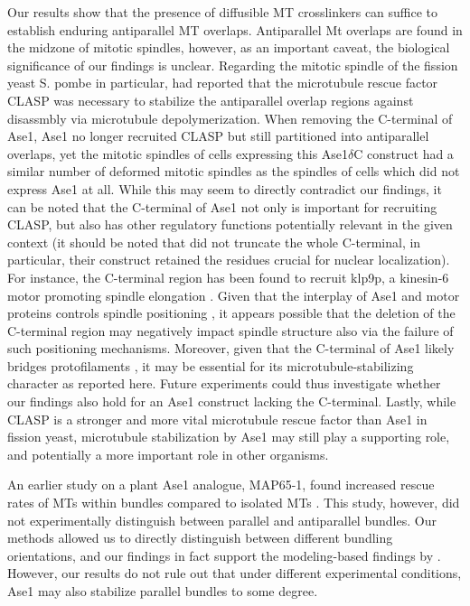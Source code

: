 Our results show that the presence of diffusible MT crosslinkers can suffice to establish enduring antiparallel MT overlaps. Antiparallel Mt overlaps are found in the midzone of mitotic spindles, however, as an important caveat, the biological significance of our findings is unclear. Regarding the mitotic spindle of the fission yeast S. pombe in particular, \cite{Bratman2007b} had reported that the microtubule rescue factor CLASP was necessary to stabilize the antiparallel overlap regions against disassmbly via microtubule depolymerization. When removing the C-terminal of Ase1, Ase1 no longer recruited CLASP but still partitioned into antiparallel overlaps, yet the mitotic spindles of cells expressing this Ase1$\delta$C construct had a similar number of deformed mitotic spindles as the spindles of cells which did not express Ase1 at all. While this may seem to directly contradict our findings, it can be noted that the C-terminal of Ase1 not only is important for recruiting CLASP, but also has other regulatory functions potentially relevant in the given context (it should be noted that \cite{Bratman2007b} did not truncate the whole C-terminal, in particular, their construct retained the residues crucial for nuclear localization). For instance, the C-terminal region has been found to recruit klp9p, a kinesin-6 motor promoting spindle elongation . Given that the interplay of Ase1 and motor proteins controls spindle positioning , it appears possible that the deletion of the C-terminal region may negatively impact spindle structure also via the failure of such positioning mechanisms. Moreover, given that the C-terminal of Ase1 likely bridges protofilaments , it may be essential for its microtubule-stabilizing character as reported here. Future experiments could thus investigate whether our findings also hold for an Ase1 construct lacking the C-terminal. Lastly, while CLASP is a stronger and more vital microtubule rescue factor than Ase1 in fission yeast, microtubule stabilization by Ase1 may still play a supporting role, and potentially a more important role in other organisms. \par

An earlier study on a plant Ase1 analogue, MAP65-1, found increased rescue rates of MTs within bundles compared to isolated MTs \parencite{Stoppin-Mellet2013}. This study, however, did not experimentally distinguish between parallel and antiparallel bundles. Our methods allowed us to directly distinguish between different bundling orientations, and our findings in fact support the modeling-based findings by \parencite{Stoppin-Mellet2013}. However, our results do not rule out that under different experimental conditions, Ase1 may also stabilize parallel bundles to some degree.\par

